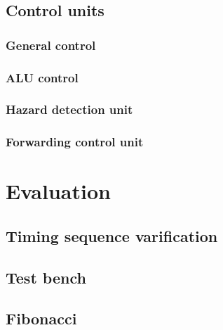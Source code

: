 \documentclass[11pt, a4paper, twoside]{IEEEtran}
\begin{document}
	\subsection{Control units}
		\subsubsection{General control}
		\subsubsection{ALU control}
		\subsubsection{Hazard detection unit}
		\subsubsection{Forwarding control unit}
		
\section{Evaluation}
	\subsection{Timing sequence varification}
	\subsection{Test bench}
	\subsection{Fibonacci}
	
\end{document}
